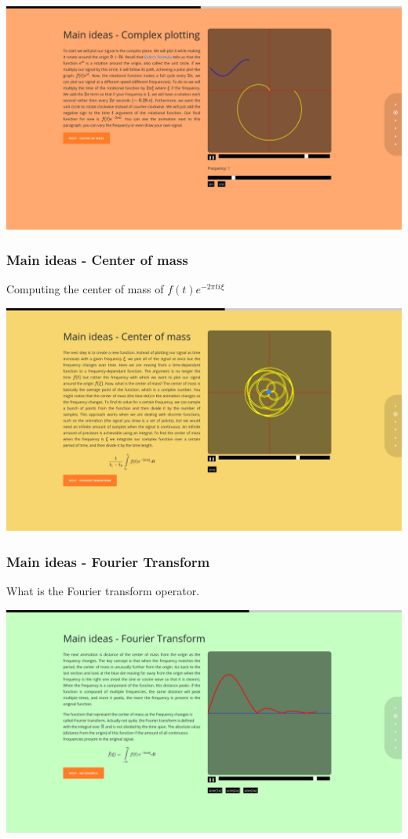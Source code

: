 \documentclass{article}
\begin{document}
\includegraphics[width=\textwidth]{chap9.png}

\subsubsection{Main ideas - Center of mass}

Computing the center of mass of \(f(t)e^{-2\pi ti\xi}\)

\includegraphics[width=\textwidth]{chap10.png}

\subsubsection{Main ideas - Fourier Transform}

What is the Fourier transform operator.

\includegraphics[width=\textwidth]{chap11.png}
\end{document}
